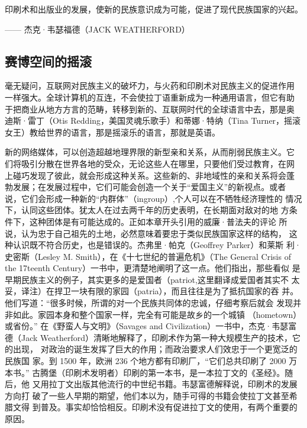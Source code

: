 \begin{tcolorbox}
印刷术和出版业的发展，使新的民族意识成为可能，促进了现代民族国家的兴起。
\begin{flushright}
—— 杰克·韦瑟福德（JACK WEATHERFORD）
\end{flushright}
\end{tcolorbox}

\subsection{赛博空间的摇滚}

毫无疑问，互联网对民族主义的破坏力，与火药和印刷术对民族主义的促进作用 一样强大。全球计算机的互连，不会使拉丁语重新成为一种通用语言，但它有助 于把商业从地方方言的范畴，转移到新的、互联网时代的全球语言中去，那是奥 迪斯·雷丁（Otis Redding，美国灵魂乐歌手）和蒂娜·特纳（Tina Turner，摇滚 女王）教给世界的语言，那是摇滚乐的语言，那就是英语。

新的网络媒体，可以创造超越地理界限的新型亲和关系，从而削弱民族主义。它 们将吸引分散在世界各地的受众，无论这些人在哪里，只要他们受过教育，在网 上碰巧发现了彼此，就会形成这种关系。这些新的、非地域性的亲和关系将会蓬 勃发展；在发展过程中，它们可能会创造一个关于“爱国主义”的新视点。或者 说，它们会形成一种新的“内群体”（ingroup）,个人可以在不牺牲经济理性的 情况下，认同这些团体。犹太人在过去两千年的历史表明，在长期面对敌对的地 方条件下，这种团体是有可能达成的。正如本章开头引用的威廉·普法夫的评论 所说，认为忠于自己祖先的土地，必然意味着要忠于类似民族国家这样的结构，  这种认识既不符合历史，也是错误的。杰弗里·帕克（Geoffrey Parker）和莱斯 利·史密斯（Lesley M. Smith），在《十七世纪的普遍危机》（The General Crisis of the 17teenth Century）一书中，更清楚地阐明了这一点。他们指出，那些看似 是早期民族主义的例子，其实更多的是爱国者（patriot,这里翻译成爱国者其实不 太妥，译注）在捍卫一块有限的家园（patria），而且往往是为了抵抗国家的吞 并。他们写道：“很多时候，所谓的对一个民族共同体的忠诚，仔细考察后就会 发现并非如此。家园本身和整个国家一样，完全有可能是故乡的一个城镇 （hometown）或省份。” 在《野蛮人与文明》（Savages and Civilization）一书中，杰克·韦瑟富德（Jack Weatherford）清晰地解释了，印刷术作为第一种大规模生产的技术，它的出现， 对政治的诞生发挥了巨大的作用；而政治要求人们效忠于一个更宽泛的民族国 家。到 1500 年，欧洲 236 个地方都有印刷厂，“它们总共印刷了 2000 万本书。” 古腾堡（印刷术发明者）印刷的第一本书，是一本拉丁文的《圣经》。随后，他 又用拉丁文出版其他流行的中世纪书籍。韦瑟富德解释说，印刷术的发展方向打 破了一些人早期的期望，他们本以为，随手可得的书籍会使拉丁文甚至希腊文得 到普及。事实却恰恰相反。印刷术没有促进拉丁文的使用，有两个重要的原因。

